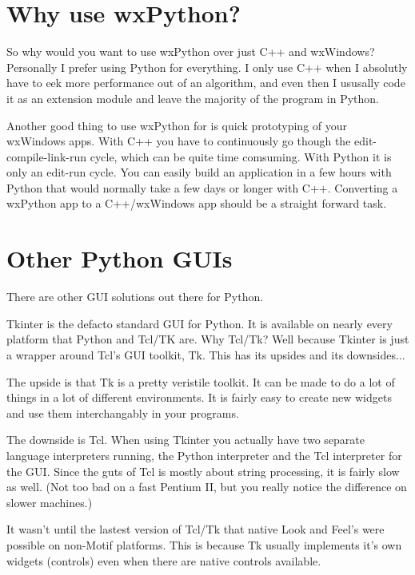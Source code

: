 \section{Why use wxPython?}\label{wxpwhy}


So why would you want to use wxPython over just C++ and wxWindows?
Personally I prefer using Python for everything.  I only use C++ when
I absolutly have to eek more performance out of an algorithm, and even
then I ususally code it as an extension module and leave the majority
of the program in Python.

Another good thing to use wxPython for is quick prototyping of your
wxWindows apps.  With C++ you have to continuously go though the
edit-compile-link-run cycle, which can be quite time comsuming.  With
Python it is only an edit-run cycle.  You can easily build an
application in a few hours with Python that would normally take a few
days or longer with C++.  Converting a wxPython app to a C++/wxWindows app
should be a straight forward task.


\section{Other Python GUIs}\label{wxpother}

There are other GUI solutions out there for Python.


Tkinter is the defacto standard GUI for Python.  It is available
on nearly every platform that Python and Tcl/TK are.  Why Tcl/Tk?
Well because Tkinter is just a wrapper around Tcl's GUI toolkit, Tk.
This has its upsides and its downsides...

The upside is that Tk is a pretty veristile toolkit.  It can be made
to do a lot of things in a lot of different environments.  It is fairly
easy to create new widgets and use them interchangably in your
programs.

The downside is Tcl.  When using Tkinter you actually have two
separate language interpreters running, the Python interpreter and the
Tcl interpreter for the GUI.  Since the guts of Tcl is mostly about
string processing, it is fairly slow as well.  (Not too bad on a fast
Pentium II, but you really notice the difference on slower machines.)

It wasn't until the lastest version of Tcl/Tk that native Look and
Feel's were possible on non-Motif platforms.  This is because Tk
usually implements it's own widgets (controls) even when there are
native controls available.

